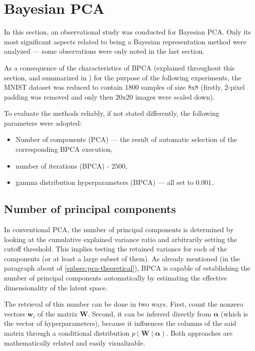 \section{Bayesian PCA}
In this section, an observational study was conducted for Bayesian PCA. Only its most significant aspects related to being a Bayesian representation method were analyzed — some observations were only noted in the last section.

\vspace{\baselineskip}
As a consequence of the characteristics of BPCA (explained throughout this section, and summarized in ) for the purpose of the following experiments, the MNIST dataset was reduced to contain 1800 samples of size $8\textrm{x}8$ (firstly, $2$-pixel padding was removed and only then $20\textrm{x}20$ images were scaled down).

\vspace{\baselineskip}
To evaluate the methods reliably, if not stated differently, the following parameters were adopted:
\begin{itemize}
    \item Number of components (PCA) — the result of automatic selection of the corresponding BPCA execution,
    \item number of iterations (BPCA) - $2500$,
    \item gamma distribution hyperparameters (BPCA) — all set to $0.001$.
\end{itemize}

\subsection{Number of principal components}
In conventional PCA, the number of principal components is determined by looking at the cumulative explained variance ratio and arbitrarily setting the cutoff threshold. This implies testing the retained variance for each of the components (or at least a large subset of them). As already mentioned (in the paragraph about  of \autoref{subsec:pca-theoretical}), BPCA is capable of establishing the number of principal components automatically by estimating the effective dimensionality of the latent space.

\vspace{\baselineskip}
The retrieval of this number can be done in two ways. First, count the nonzero vectors $\mathbf{w}_i$ of the matrix $\mathbf{W}$. Second, it can be inferred directly from $\boldsymbol{\alpha}$ (which is the vector of hyperparameters), because it influences the columns of the said matrix through a conditional distribution $p(\mathbf{W} \mid \boldsymbol{\alpha})$. Both approaches are mathematically related and easily visualizable.

